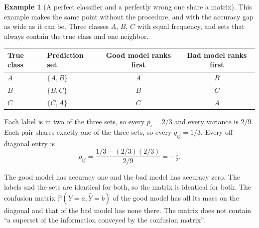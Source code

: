 \documentclass[11pt]{article}
\theoremstyle{definition}
\newtheorem{example}{Example}
\theoremstyle{definition}
\theoremstyle{remark}
\newcommand{\Prob}{\mathbb{P}}
\newcommand{\set}[1]{\{#1\}}
\begin{document}
\begin{example}[A perfect classifier and a perfectly wrong one share a matrix]\label{ex:perfect}
This example makes the same point without the procedure, and with the accuracy gap as wide as it
can be. Three classes $A$, $B$, $C$ with equal frequency, and sets that always contain the true
class and one neighbor.

\begin{center}
\begin{tabular}{llcc}
\toprule
True class & Prediction set & Good model ranks first & Bad model ranks first \\
\midrule
$A$ & $\set{A, B}$ & $A$ & $B$ \\
$B$ & $\set{B, C}$ & $B$ & $C$ \\
$C$ & $\set{C, A}$ & $C$ & $A$ \\
\bottomrule
\end{tabular}
\end{center}

Each label is in two of the three sets, so every $p_i = 2/3$ and every variance is $2/9$. Each pair
shares exactly one of the three sets, so every $q_{ij} = 1/3$. Every off-diagonal entry is
\[
\rho_{ij} = \frac{1/3 - (2/3)(2/3)}{2/9} = -\tfrac12 .
\]

The good model has accuracy one and the bad model has accuracy zero. The labels and the sets are
identical for both, so the matrix is identical for both. The confusion matrix
$\Prob(Y = a, \hat Y = b)$ of the good model has all its mass on the diagonal and that of the bad
model has none there. The matrix does not contain ``a superset of the information conveyed by the
confusion matrix''.
\end{example}
\end{document}
